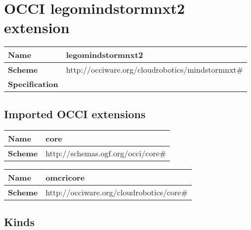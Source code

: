 \section{OCCI legomindstormnxt2 extension}
\begin{center}
\begin{tabular}{|l|l|}
  \hline
  \textbf{Name} & legomindstormnxt2 \\
  \hline  
  \textbf{Scheme} & http://occiware.org/cloudrobotics/mindstormnxt\# \\
  \hline
  \textbf{Specification} &  \\
  \hline
\end{tabular}
\end{center}

\subsection{Imported OCCI extensions}

\begin{center} 
\begin{tabular}{|l|l|}
  \hline
  \textbf{Name} & core \\
  \hline  
  \textbf{Scheme} & http://schemas.ogf.org/occi/core\# \\
  \hline
\end{tabular}
\end{center}
\begin{center} 
\begin{tabular}{|l|l|}
  \hline
  \textbf{Name} & omcricore \\
  \hline  
  \textbf{Scheme} & http://occiware.org/cloudrobotics/core\# \\
  \hline
\end{tabular}
\end{center}


\subsection{Kinds}

